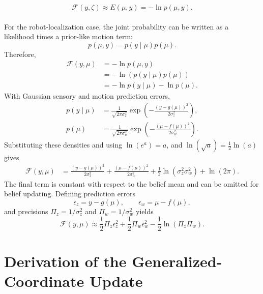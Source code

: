 \begin{equation}
    \mathcal{F}(y,\zeta)\approx E(\mu,y)=-\ln p(\mu,y).
\end{equation}
\\
For the robot-localization case, the joint probability can be written as a likelihood times a prior-like motion term:
\begin{equation}
    p(\mu,y)
    =
    p(y\mid\mu)p(\mu).
\end{equation}
Therefore,
\begin{align}
    \mathcal{F}(y,\mu)
    &=
    -\ln p(\mu,y)
    \nonumber \\
    &=
    -\ln\left(p(y\mid\mu)p(\mu)\right)
    \nonumber \\
    &=
    -\ln p(y\mid\mu)
    -
    \ln p(\mu).
\end{align}
With Gaussian sensory and motion prediction errors,
\begin{align}
    p(y\mid\mu)
    &=
    \frac{1}{\sqrt{2\pi\sigma_z^2}}
    \exp
    \left(
        -\frac{\left(y-g(\mu)\right)^2}{2\sigma_z^2}
    \right),
    \nonumber \\
    p(\mu)
    &=
    \frac{1}{\sqrt{2\pi\sigma_w^2}}
    \exp
    \left(
        -\frac{\left(\mu-f(\mu)\right)^2}{2\sigma_w^2}
    \right).
\end{align}
Substituting these densities and using $\ln(e^a)=a$, and $\ln(\sqrt{a})=\frac{1}{2}\ln(a)$ gives
\begin{align}
    \mathcal{F}(y,\mu)
    &=
    \frac{\left(y-g(\mu)\right)^2}{2\sigma_z^2}
    +
    \frac{\left(\mu-f(\mu)\right)^2}{2\sigma_w^2}
    +
    \frac{1}{2}\ln\left(\sigma_z^2\sigma_w^2\right)
    +
    \ln(2\pi).
\end{align}
The final term is constant with respect to the belief mean and can be omitted for belief updating. Defining prediction errors
\begin{equation}
    \epsilon_z = y-g(\mu),
    \qquad
    \epsilon_w = \mu-f(\mu),
\end{equation}
and precisions $\Pi_z=1/\sigma_z^2$ and $\Pi_w=1/\sigma_w^2$ yields
\begin{equation}
    \mathcal{F}(y,\mu)
    \approx
    \frac{1}{2}\Pi_z\epsilon_z^2
    +
    \frac{1}{2}\Pi_w\epsilon_w^2
    -
    \frac{1}{2}\ln\left(\Pi_z\Pi_w\right).
\end{equation}


\section{Derivation of the Generalized-Coordinate Update}
\label{app:slide15-update-derivation}

